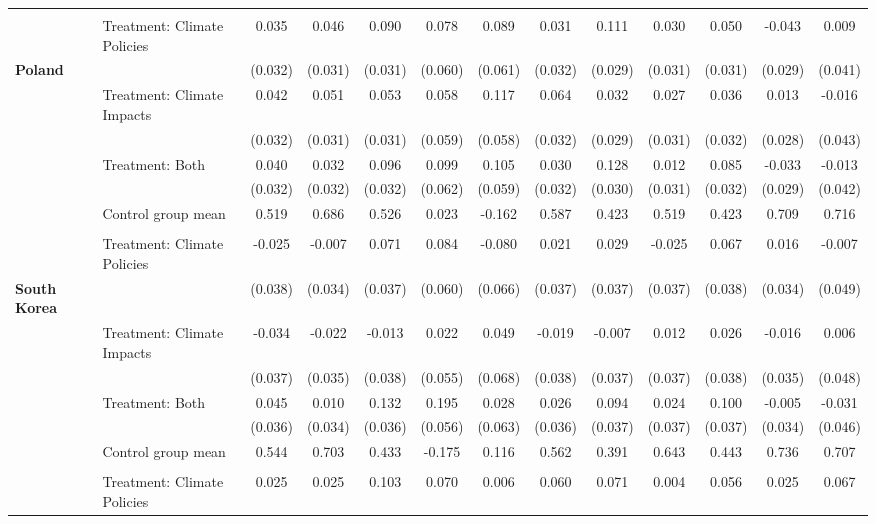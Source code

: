 \begin{tabular}[t]{llccccccccccc}
 &  &  &  &  &  &  &  &  &  &  &  & \\
 & Treatment: Climate Policies & 0.035 & 0.046 & 0.090 & 0.078 & 0.089 & 0.031 & 0.111 & 0.030 & 0.050 & -0.043 & 0.009\\
\textbf{Poland} &  & (0.032) & (0.031) & (0.031) & (0.060) & (0.061) & (0.032) & (0.029) & (0.031) & (0.031) & (0.029) & (0.041)\\
 & Treatment: Climate Impacts & 0.042 & 0.051 & 0.053 & 0.058 & 0.117 & 0.064 & 0.032 & 0.027 & 0.036 & 0.013 & -0.016\\
 &  & (0.032) & (0.031) & (0.031) & (0.059) & (0.058) & (0.032) & (0.029) & (0.031) & (0.032) & (0.028) & (0.043)\\
 & Treatment: Both & 0.040 & 0.032 & 0.096 & 0.099 & 0.105 & 0.030 & 0.128 & 0.012 & 0.085 & -0.033 & -0.013\\
 &  & (0.032) & (0.032) & (0.032) & (0.062) & (0.059) & (0.032) & (0.030) & (0.031) & (0.032) & (0.029) & (0.042)\\
\midrule
 & Control group mean & 0.519 & 0.686 & 0.526 & 0.023 & -0.162 & 0.587 & 0.423 & 0.519 & 0.423 & 0.709 & 0.716\\
 &  &  &  &  &  &  &  &  &  &  &  & \\
 & Treatment: Climate Policies & -0.025 & -0.007 & 0.071 & 0.084 & -0.080 & 0.021 & 0.029 & -0.025 & 0.067 & 0.016 & -0.007\\
\textbf{South Korea} &  & (0.038) & (0.034) & (0.037) & (0.060) & (0.066) & (0.037) & (0.037) & (0.037) & (0.038) & (0.034) & (0.049)\\
 & Treatment: Climate Impacts & -0.034 & -0.022 & -0.013 & 0.022 & 0.049 & -0.019 & -0.007 & 0.012 & 0.026 & -0.016 & 0.006\\
 &  & (0.037) & (0.035) & (0.038) & (0.055) & (0.068) & (0.038) & (0.037) & (0.037) & (0.038) & (0.035) & (0.048)\\
 & Treatment: Both & 0.045 & 0.010 & 0.132 & 0.195 & 0.028 & 0.026 & 0.094 & 0.024 & 0.100 & -0.005 & -0.031\\
 &  & (0.036) & (0.034) & (0.036) & (0.056) & (0.063) & (0.036) & (0.037) & (0.037) & (0.037) & (0.034) & (0.046)\\
\midrule
 & Control group mean & 0.544 & 0.703 & 0.433 & -0.175 & 0.116 & 0.562 & 0.391 & 0.643 & 0.443 & 0.736 & 0.707\\
 &  &  &  &  &  &  &  &  &  &  &  & \\
 & Treatment: Climate Policies & 0.025 & 0.025 & 0.103 & 0.070 & 0.006 & 0.060 & 0.071 & 0.004 & 0.056 & 0.025 & 0.067\\

\end{tabular}
